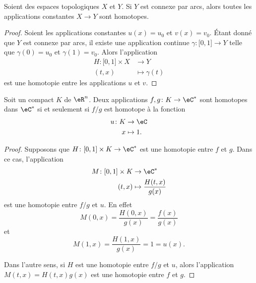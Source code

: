 \begin{lemma}   \label{LEMooMJKEooCaVhjD}
	Soient des espaces topologiques \( X\) et \( Y\). Si \( Y\) est connexe par arcs, alors toutes les applications constantes \( X\to Y\) sont homotopes.
\end{lemma}

\begin{proof}
	Soient les applications constantes \( u(x)=u_0\) et \( v(x)=v_0\). Étant donné que \( Y\) est connexe par arcs, il existe une application continue \( \gamma\colon \mathopen[ 0 , 1 \mathclose]\to Y\) telle que \( \gamma(0)=u_0\) et \( \gamma(1)=v_0\). Alors l'application
	\begin{equation}
		\begin{aligned}
			H\colon \mathopen[ 0 , 1 \mathclose]\times X & \to Y             \\
			(t,x)                                        & \mapsto \gamma(t)
		\end{aligned}
	\end{equation}
	est une homotopie entre les applications \( u\) et \( v\).
\end{proof}

\begin{proposition}       \label{PROPooNABDooFtKukO}
	Soit un compact \( K\) de \( \eR^n\). Deux applications \( f,g\colon K\to \eC^*\) sont homotopes dans \( \eC^*\) si et seulement si \( f/g\) est homotope à la fonction
	\begin{equation}
		\begin{aligned}
			u\colon K & \to \eC    \\
			x         & \mapsto 1.
		\end{aligned}
	\end{equation}
\end{proposition}

\begin{proof}
	Supposons que \( H\colon \mathopen[ 0 , 1 \mathclose]\times K\to \eC^*\) est une homotopie entre \( f\) et \( g\). Dans ce cas, l'application
	\begin{equation}
		\begin{aligned}
			M\colon \mathopen[ 0 , 1 \mathclose]\times K & \to \eC^*                       \\
			(t,x)                                        & \mapsto \frac{ H(t,x) }{ g(x) }
		\end{aligned}
	\end{equation}
	est une homotopie entre \( f/g\) et \( u\). En effet
	\begin{equation}
		M(0,x)=\frac{ H(0,x) }{ g(x) }=\frac{ f(x) }{ g(x) }
	\end{equation}
	et
	\begin{equation}
		M(1,x)=\frac{ H(1,x) }{ g(x) }=1=u(x).
	\end{equation}

	Dans l'autre sens, si \( H\) est une homotopie entre \( f/g\) et \( u\), alors l'application \( M(t,x)=H(t,x)g(x)\) est une homotopie entre \( f\) et \( g\).
\end{proof}


